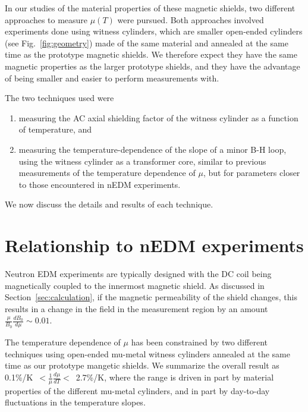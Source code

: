 \documentclass[review,number,sort&compress]{elsarticle}
\begin{document}
In our studies of the material properties of these magnetic shields,
two different approaches to measure $\mu(T)$ were pursued.  Both
approaches involved experiments done using witness cylinders, which
are smaller open-ended cylinders (see Fig.~\ref{fig:geometry}) made of
the same material and annealed at the same time as the prototype
magnetic shields.  We therefore expect they have the same magnetic
properties as the larger prototype shields, and they have the
advantage of being smaller and easier to perform measurements with.



The two techniques used were
\begin{enumerate}
\item measuring the AC axial shielding factor of the witness cylinder
  as a function of temperature, and
\item measuring the temperature-dependence of the slope of a minor B-H
  loop, using the witness cylinder as a transformer core, similar to
  previous measurements of the temperature dependence of $\mu$, but
  for parameters closer to those encountered in nEDM experiments.
\end{enumerate}
We now discuss the details and results of each technique.







\section{Relationship to nEDM experiments}

Neutron EDM experiments are typically designed with the DC coil being
magnetically coupled to the innermost magnetic shield.  As discussed
in Section~\ref{sec:calculation}, if the magnetic permeability of the
shield changes, this results in a change in the field in the
measurement region by an amount $\frac{\mu}{B_0}\frac{dB_0}{d\mu}\sim
0.01$.

The temperature dependence of $\mu$ has been constrained by two
different techniques using open-ended mu-metal witness cylinders
annealed at the same time as our prototype mangetic shields.  We
summarize the overall result as
0.1\%/K~$<\frac{1}{\mu}\frac{d\mu}{dT}<$~2.7\%/K, where the range is
driven in part by material properties of the different mu-metal
cylinders, and in part by day-to-day fluctuations in the temperature
slopes.
\end{document}
